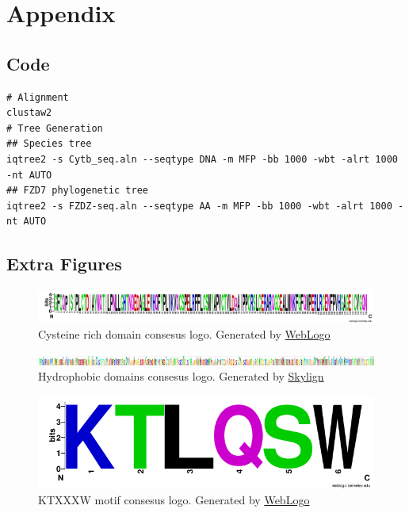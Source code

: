 \documentclass[11pt, a4paper]{article}
\begin{document}
\section{Appendix}
\subsection*{Code}
\begin{verbatim}
# Alignment
clustaw2
# Tree Generation
## Species tree
iqtree2 -s Cytb_seq.aln --seqtype DNA -m MFP -bb 1000 -wbt -alrt 1000 -nt AUTO
## FZD7 phylogenetic tree
iqtree2 -s FZDZ-seq.aln --seqtype AA -m MFP -bb 1000 -wbt -alrt 1000 -nt AUTO
\end{verbatim}
\subsection*{Extra Figures}
\begin{figure}[H]
    \includegraphics[width=0.8\linewidth]{Figures/CRD_sequence_logo.png} 
    \caption{Cysteine rich domain consesus logo. Generated by \href{https://weblogo.berkeley.edu/logo.cgi}{WebLogo} }
    \label{fig:CRD-logo}
\end{figure}

\begin{figure}[H]
    \includegraphics[width=0.8\linewidth]{Figures/hydrophobic_region_logo-2.png} 
    \caption{Hydrophobic domains consesus logo. Generated by \href{http://skylign.org/}{Skylign}}
    \label{fig:hydroDomains-logo}
\end{figure}

\begin{figure}[H]
    \includegraphics[width=0.8\linewidth]{Figures/KTXXXW.png} 
    \caption{KTXXXW motif consesus logo. Generated by \href{https://weblogo.berkeley.edu/logo.cgi}{WebLogo}}
    \label{fig:KTXXXW motif-logo}
\end{figure}
\end{document}
